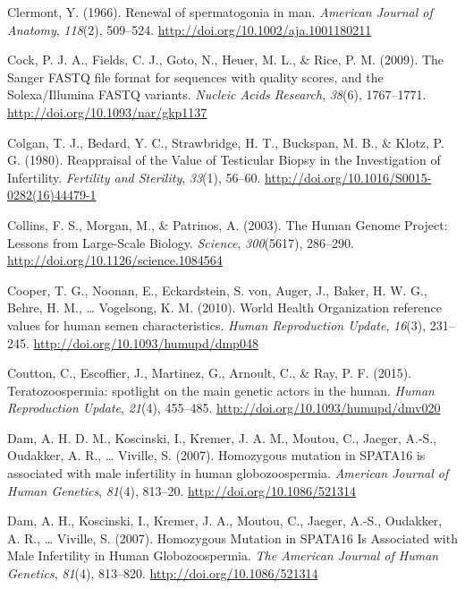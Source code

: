 \documentclass[12pt,twoside]{reedthesis}
\theoremstyle{definition}
\theoremstyle{definition}
\theoremstyle{remark}
\begin{document}
  \hypertarget{ref-Clermont1966}{}
  Clermont, Y. (1966). Renewal of spermatogonia in man. \emph{American
  Journal of Anatomy}, \emph{118}(2), 509--524.
  \url{http://doi.org/10.1002/aja.1001180211}
  
  \hypertarget{ref-Cock2009}{}
  Cock, P. J. A., Fields, C. J., Goto, N., Heuer, M. L., \& Rice, P. M.
  (2009). The Sanger FASTQ file format for sequences with quality scores,
  and the Solexa/Illumina FASTQ variants. \emph{Nucleic Acids Research},
  \emph{38}(6), 1767--1771. \url{http://doi.org/10.1093/nar/gkp1137}
  
  \hypertarget{ref-Colgan1980}{}
  Colgan, T. J., Bedard, Y. C., Strawbridge, H. T., Buckspan, M. B., \&
  Klotz, P. G. (1980). Reappraisal of the Value of Testicular Biopsy in
  the Investigation of Infertility. \emph{Fertility and Sterility},
  \emph{33}(1), 56--60. \url{http://doi.org/10.1016/S0015-0282(16)44479-1}
  
  \hypertarget{ref-Collins2003}{}
  Collins, F. S., Morgan, M., \& Patrinos, A. (2003). The Human Genome
  Project: Lessons from Large-Scale Biology. \emph{Science},
  \emph{300}(5617), 286--290. \url{http://doi.org/10.1126/science.1084564}
  
  \hypertarget{ref-Cooper2010}{}
  Cooper, T. G., Noonan, E., Eckardstein, S. von, Auger, J., Baker, H. W.
  G., Behre, H. M., \ldots{} Vogelsong, K. M. (2010). World Health
  Organization reference values for human semen characteristics.
  \emph{Human Reproduction Update}, \emph{16}(3), 231--245.
  \url{http://doi.org/10.1093/humupd/dmp048}
  
  \hypertarget{ref-Coutton2015}{}
  Coutton, C., Escoffier, J., Martinez, G., Arnoult, C., \& Ray, P. F.
  (2015). Teratozoospermia: spotlight on the main genetic actors in the
  human. \emph{Human Reproduction Update}, \emph{21}(4), 455--485.
  \url{http://doi.org/10.1093/humupd/dmv020}
  
  \hypertarget{ref-Dam2007}{}
  Dam, A. H. D. M., Koscinski, I., Kremer, J. A. M., Moutou, C., Jaeger,
  A.-S., Oudakker, A. R., \ldots{} Viville, S. (2007). Homozygous mutation
  in SPATA16 is associated with male infertility in human globozoospermia.
  \emph{American Journal of Human Genetics}, \emph{81}(4), 813--20.
  \url{http://doi.org/10.1086/521314}
  
  \hypertarget{ref-Dam2007a}{}
  Dam, A. H., Koscinski, I., Kremer, J. A., Moutou, C., Jaeger, A.-S.,
  Oudakker, A. R., \ldots{} Viville, S. (2007). Homozygous Mutation in
  SPATA16 Is Associated with Male Infertility in Human Globozoospermia.
  \emph{The American Journal of Human Genetics}, \emph{81}(4), 813--820.
  \url{http://doi.org/10.1086/521314}
  
\end{document}
